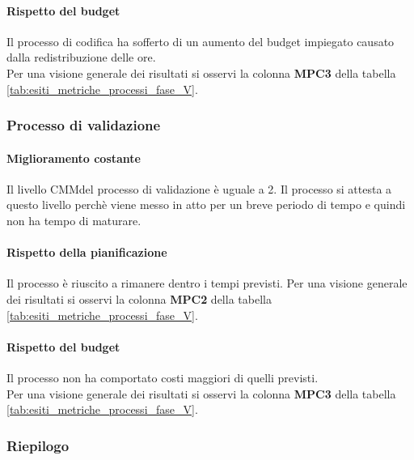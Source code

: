\documentclass[../PianoDiQualifica.tex]{subfiles}
\begin{document}
\begin{appendices}
			\paragraph{Rispetto del budget}
			Il processo di codifica ha sofferto di un aumento del budget impiegato causato dalla redistribuzione delle ore.\\
			Per una visione generale dei risultati si osservi la colonna \textbf{MPC3}  della tabella \ref{tab:esiti_metriche_processi_fase_V}.
			
	\subsubsection{Processo di validazione}
				\paragraph{Miglioramento costante}
				Il livello CMM\g del processo di validazione è uguale a 2. Il processo si attesta a questo livello perchè viene messo in atto per un breve periodo di tempo e quindi non ha tempo di maturare.
				
				\paragraph{Rispetto della pianificazione}
				Il processo è riuscito a rimanere dentro i tempi previsti.
				Per una visione generale dei risultati si osservi la colonna \textbf{MPC2}  della tabella \ref{tab:esiti_metriche_processi_fase_V}.
				
				\paragraph{Rispetto del budget}
				Il processo non ha comportato costi maggiori di quelli previsti.\\
				Per una visione generale dei risultati si osservi la colonna \textbf{MPC3}  della tabella \ref{tab:esiti_metriche_processi_fase_V}.
			
			\subsubsection{Riepilogo}
			

\end{appendices}
\end{document}
